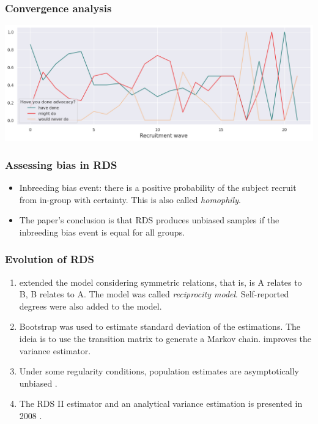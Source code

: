 \documentclass{beamer}
\newcommand{\Space}{\vspace{3ex}}
\begin{document}
\begin{frame}
  \frametitle{Convergence analysis}

  \includegraphics[width=\textwidth]{../../images/recruitment-wave-convergence.png}
\end{frame}

\begin{frame}
  \frametitle{Assessing bias in RDS}

  \begin{itemize}
    \justifying

    \item Inbreeding bias event: there is a positive probability of the subject recruit
  from in-group with certainty. This is also called {\em homophily}.

    \Space 

    \item The paper's conclusion is that RDS produces unbiased samples if the
    inbreeding bias event is equal for all groups.
  \end{itemize}

\end{frame}

\begin{frame}
  \frametitle{Evolution of RDS}

  \begin{enumerate}
    \justifying

    \item<1> \cite{heckathorn2002respondent} extended the model considering symmetric
    relations, that is, is A relates to B, B relates to A. The model was
    called {\em reciprocity model}. Self-reported degrees were also added to
    the model. 

    \item<2> Bootstrap was used to estimate standard deviation of the
    estimations. The ideia is to use the transition matrix to generate a
    Markov chain. \cite{salganik2006variance} improves the variance estimator.
    
    \item<3> Under some regularity conditions, population estimates are
    asymptotically unbiased \cite{salganik2004sampling}.    
    
    \item<4> The RDS II estimator and an analytical variance estimation is
    presented in 2008 \cite{volz2008probability}.
  \end{enumerate}

\end{frame}
\end{document}
